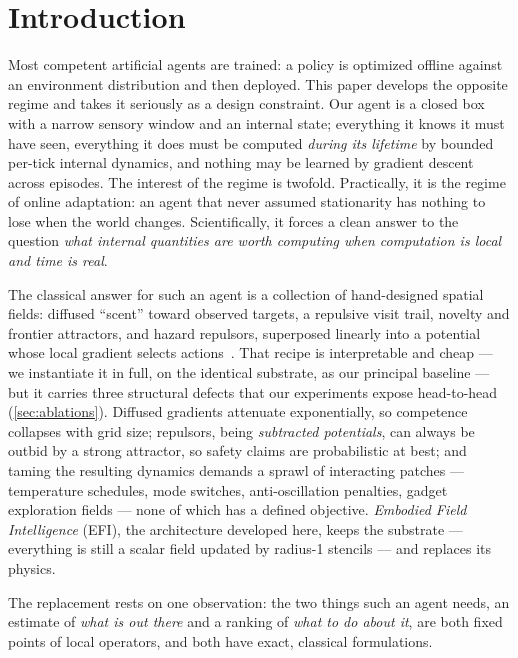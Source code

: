 \documentclass[11pt]{article}
\begin{document}
\section{Introduction}
Most competent artificial agents are trained: a policy is optimized offline against an environment distribution and then deployed. This paper develops the opposite regime and takes it seriously as a design constraint. Our agent is a closed box with a narrow sensory window and an internal state; everything it knows it must have seen, everything it does must be computed \emph{during its lifetime} by bounded per-tick internal dynamics, and nothing may be learned by gradient descent across episodes. The interest of the regime is twofold. Practically, it is the regime of online adaptation: an agent that never assumed stationarity has nothing to lose when the world changes. Scientifically, it forces a clean answer to the question \emph{what internal quantities are worth computing when computation is local and time is real}.

The classical answer for such an agent is a collection of hand-designed spatial fields: diffused ``scent'' toward observed targets, a repulsive visit trail, novelty and frontier attractors, and hazard repulsors, superposed linearly into a potential whose local gradient selects actions~\citep{khatib1986,brooks1991,dorigo1996}. That recipe is interpretable and cheap --- we instantiate it in full, on the identical substrate, as our principal baseline --- but it carries three structural defects that our experiments expose head-to-head (\cref{sec:ablations}). Diffused gradients attenuate exponentially, so competence collapses with grid size; repulsors, being \emph{subtracted potentials}, can always be outbid by a strong attractor, so safety claims are probabilistic at best; and taming the resulting dynamics demands a sprawl of interacting patches --- temperature schedules, mode switches, anti-oscillation penalties, gadget exploration fields --- none of which has a defined objective. \emph{Embodied Field Intelligence} (EFI), the architecture developed here, keeps the substrate --- everything is still a scalar field updated by radius-1 stencils --- and replaces its physics.

The replacement rests on one observation: the two things such an agent needs, an estimate of \emph{what is out there} and a ranking of \emph{what to do about it}, are both fixed points of local operators, and both have exact, classical formulations.
\end{document}
